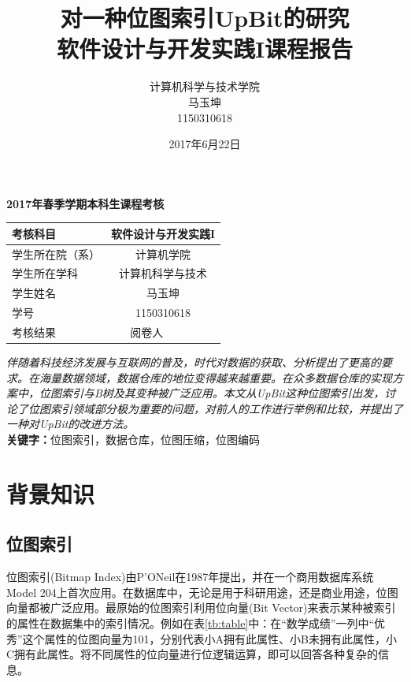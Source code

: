 \documentclass[11pt, a4paper]{article}
\begin{document}
\begin{center}
  {\bf \Huge 2017年春季学期本科生课程考核}
\end{center}

\title{{\bf 对一种位图索引UpBit\cite{art1}的研究}\\软件设计与开发实践I课程报告}
\renewcommand\arraystretch{2}
\begin{table}[H]
\centering
\begin{tabular}{|p{3cm}<{\centering}|p{3cm}<{\centering}|p{3cm}<{\centering}|p{3cm}<{\centering}|}
  \hline
考核科目     & \multicolumn{3}{c|}{软件设计与开发实践I} \\ \hline
学生所在院（系） & \multicolumn{3}{c|}{计算机学院}      \\ \hline
学生所在学科   & \multicolumn{3}{c|}{计算机科学与技术}   \\ \hline
学生姓名     & \multicolumn{3}{c|}{马玉坤}        \\ \hline
学号       & \multicolumn{3}{c|}{1150310618} \\ \hline
考核结果     &          & 阅卷人        &         \\ \hline
\end{tabular}
\end{table}
  \author{计算机科学与技术学院\\马玉坤\\1150310618}
  \date{2017年6月22日}

  \maketitle

  \emph{伴随着科技经济发展与互联网的普及，时代对数据的获取、分析提出了更高的要求。在海量数据领域，数据仓库的地位变得越来越重要。在众多数据仓库的实现方案中，位图索引与B树及其变种被广泛应用。本文从UpBit这种位图索引出发，讨论了位图索引领域部分极为重要的问题，对前人的工作进行举例和比较，并提出了一种对UpBit的改进方法。}\\
  {\bf 关键字：}位图索引，数据仓库，位图压缩，位图编码

  \tableofcontents

  \clearpage

  \section{背景知识}

  \subsection{位图索引}
  位图索引(Bitmap Index)由P’ONeil在1987年提出，并在一个商用数据库系统Model 204上首次应用。在数据库中，无论是用于科研用途，还是商业用途，位图向量都被广泛应用。\cite{art3}最原始的位图索引利用位向量(Bit Vector)来表示某种被索引的属性在数据集中的索引情况。例如在表\ref{tb:table}中：在“数学成绩”一列中“优秀”这个属性的位图向量为101，分别代表小A拥有此属性、小B未拥有此属性，小C拥有此属性。将不同属性的位向量进行位逻辑运算，即可以回答各种复杂的信息。
\end{document}
